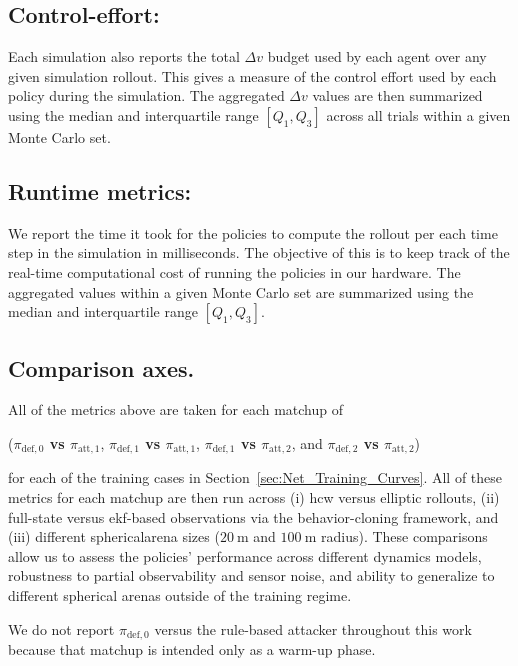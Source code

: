 \subsection*{Control-effort:}

Each simulation also reports the total \(\Delta v\) budget used by each agent over any given simulation rollout. This gives a measure of the control effort used by each policy during the simulation. The aggregated \(\Delta v\) values are then summarized using the median and interquartile range \([Q_1,Q_3]\)
across all trials within a given Monte Carlo set.

\subsection*{Runtime metrics:}

We report the time it took for the policies to compute the rollout per each time step in the simulation in milliseconds. The objective of this is to keep track of the real-time computational cost of running the policies in our hardware. The aggregated values within a given Monte Carlo set are summarized using the median and interquartile range \([Q_1,Q_3]\).


\subsection*{Comparison axes.}
All of the metrics above are taken for each matchup of 

({\boldmath\textbf{$\pi_{\mathrm{def},0}$ vs $\pi_{\mathrm{att},1}$}}, {\boldmath\textbf{$\pi_{\mathrm{def},1}$ vs $\pi_{\mathrm{att},1}$}}, {\boldmath\textbf{$\pi_{\mathrm{def},1}$ vs $\pi_{\mathrm{att},2}$}}, and {\boldmath\textbf{$\pi_{\mathrm{def},2}$ vs $\pi_{\mathrm{att},2}$}}) 


for each of the training cases in Section~\ref{sec:Net_Training_Curves}. All of these metrics for each matchup are then run across (i) \acs{hcw} versus elliptic rollouts, (ii) full-state versus \acs{ekf}-based observations via the behavior-cloning framework, and (iii) different sphericalarena sizes ($20~\mathrm{m}$ and $100~\mathrm{m}$ radius). These comparisons allow us to assess the policies' performance across different dynamics models, robustness to partial observability and sensor noise, and ability to generalize to different spherical arenas outside of the training regime.

We do not report {\boldmath\textbf{$\pi_{\mathrm{def},0}$}} versus the rule-based attacker throughout this work because that matchup is intended only as a warm-up phase.


